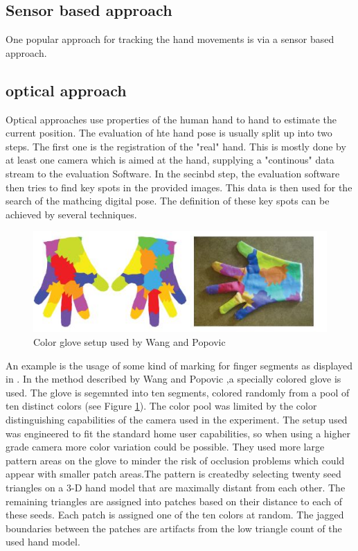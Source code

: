 \subsection{Sensor based approach}
One popular approach for tracking the hand movements is via a sensor based approach. 
\label{Sensor based approach}
\subsection{optical approach}
\label{optical approach} 
Optical approaches use properties of the human hand to hand to estimate the current position. The evaluation of hte hand pose is usually split up into two steps. The first one is the registration of the "real" hand. This is mostly done by at least one camera which is aimed at the hand, supplying a "continous" data stream to the evaluation Software. In the secinbd step, the evaluation software then tries to find key spots in the provided images. This data is then used for the search of the mathcing digital pose. The definition of these key spots can be achieved by several techniques.\\
\begin{figure}
\includegraphics[scale=0.61]{images/wang_color_glove.JPG}
\caption{Color glove setup used by Wang and Popovic \cite{Wang.2009} }
\label{wang color glove}
\end{figure}
An example is the usage of some kind of marking for finger segments as displayed in \cite{Duca.2007,Fredriksson.2008,Wang.2009}.
In the method described by Wang and Popovic \cite{Wang.2009},a specially colored glove is used. The glove is segemnted into ten segments, colored randomly from a pool of ten distinct colors (see Figure \ref{wang color glove}). The color pool was limited by the color distinguishing capabilities of the camera used in the experiment. The setup used was engineered to fit the standard home user capabilities, so when using a higher grade camera more color variation could be possible. They used more large pattern areas on the glove to minder the risk of occlusion problems which could appear with smaller patch areas.The pattern is createdby selecting twenty seed triangles on a 3-D hand model that are maximally distant from each other. The remaining triangles are assigned into patches based on their distance to each of these seeds. Each patch is assigned one of the ten colors at random. The jagged boundaries between the patches are artifacts from the low triangle count of the used hand model.\\
